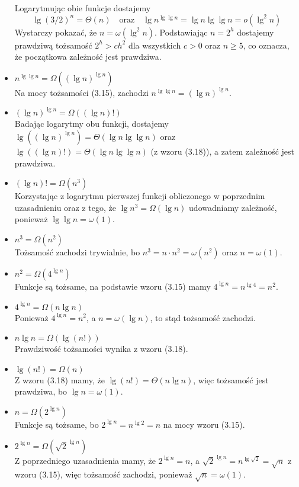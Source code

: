 \begin{itemize}
	Logarytmując obie funkcje dostajemy
	\[
		\lg(3/2)^n = \Theta(n)\quad\mbox{oraz}\quad\lg n^{\lg\lg n} = \lg n\lg\lg n = o\left(\lg^2n\right)
	\]
	Wystarczy pokazać, że $n=\omega\left(\lg^2n\right)$. Podstawiając $n=2^h$ dostajemy prawdziwą tożsamość $2^h>ch^2$ dla wszystkich $c>0$ oraz $n\ge 5$, co oznacza, że początkowa zależność jest prawdziwa.
\item $n^{\lg\lg n}=\Omega\left((\lg n)^{\lg n}\right)$ \\
	Na mocy tożsamości (3.15), zachodzi $n^{\lg\lg n}=(\lg n)^{\lg n}$.
\item $(\lg n)^{\lg n}=\Omega((\lg n)!)$ \\
	Badając logarytmy obu funkcji, dostajemy $\lg\left((\lg n)^{\lg n}\right) = \Theta(\lg n\lg\lg n)$ oraz $\lg((\lg n)!)=\Theta(\lg n\lg\lg n)$ (z wzoru (3.18)), a zatem zależność jest prawdziwa.
\item $(\lg n)!=\Omega(n^3)$ \\
	Korzystając z logarytmu pierwszej funkcji obliczonego w poprzednim uzasadnieniu oraz z tego, że $\lg n^3=\Omega(\lg n)$ udowadniamy zależność, ponieważ $\lg\lg n=\omega(1)$.
\item $n^3=\Omega(n^2)$ \\
	Tożsamość zachodzi trywialnie, bo $n^3=n\cdot n^2=\omega(n^2)$ oraz $n=\omega(1)$.
\item $n^2=\Omega\left(4^{\lg n}\right)$ \\
	Funkcje są tożsame, na podstawie wzoru (3.15) mamy $4^{\lg n}=n^{\lg 4}=n^2$.
\item $4^{\lg n}=\Omega(n\lg n)$ \\
	Ponieważ $4^{\lg n}=n^2$, a $n=\omega(\lg n)$, to stąd tożsamość zachodzi.
\item $n\lg n=\Omega(\lg (n!))$ \\
	Prawdziwość tożsamości wynika z wzoru (3.18).
\item $\lg (n!)=\Omega(n)$ \\
	Z wzoru (3.18) mamy, że $\lg (n!)=\Theta(n\lg n)$, więc tożsamość jest prawdziwa, bo $\lg n=\omega(1)$.
\item $n=\Omega\left(2^{\lg n}\right)$ \\
	Funkcje są tożsame, bo $2^{\lg n}=n^{\lg 2}=n$ na mocy wzoru (3.15).
\item $2^{\lg n}=\Omega\left(\sqrt{2}^{\lg n}\right)$ \\
	Z poprzedniego uzasadnienia mamy, że $2^{\lg n}=n$, a $\sqrt{2}^{\lg n}=n^{\lg\sqrt{2}}=\sqrt{n}$ z wzoru (3.15), więc tożsamość zachodzi, ponieważ $\sqrt{n}=\omega(1)$.

\end{itemize}
